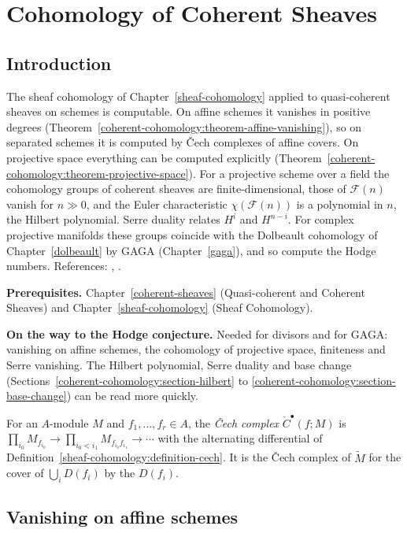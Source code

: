 \chapter{Cohomology of Coherent Sheaves}\label{coherent-cohomology}

\section{Introduction}\label{coherent-cohomology:section-introduction}

The sheaf cohomology of Chapter~\ref{sheaf-cohomology} applied to quasi-coherent sheaves on schemes is computable. On affine schemes it
vanishes in positive degrees (Theorem~\ref{coherent-cohomology:theorem-affine-vanishing}), so on separated schemes it is computed by \v{C}ech
complexes of affine covers. On projective space everything can be computed explicitly
(Theorem~\ref{coherent-cohomology:theorem-projective-space}). For a projective scheme over a field the cohomology groups of coherent sheaves are
finite-dimensional, those of $\mathcal{F}(n)$ vanish for $n \gg 0$, and the Euler characteristic $\chi(\mathcal{F}(n))$ is a polynomial in $n$, the
Hilbert polynomial. Serre duality relates $H^i$ and $H^{n-i}$. For complex projective manifolds these groups coincide with the Dolbeault
cohomology of Chapter~\ref{dolbeault} by GAGA (Chapter~\ref{gaga}), and so compute the Hodge numbers. References:
\cite[Chapter III]{hartshorne-ag}, \cite{stacks-project}.

\noindent\textbf{Prerequisites.} Chapter~\ref{coherent-sheaves} (Quasi-coherent and Coherent Sheaves) and Chapter~\ref{sheaf-cohomology}
(Sheaf Cohomology).

\noindent\textbf{On the way to the Hodge conjecture.} Needed for divisors and for GAGA: vanishing on affine schemes, the cohomology of projective space, finiteness and Serre vanishing. The Hilbert
polynomial, Serre duality and base change (Sections~\ref{coherent-cohomology:section-hilbert} to \ref{coherent-cohomology:section-base-change}) can be read more quickly.

For an $A$-module $M$ and $f_1, \ldots, f_r \in A$, the \emph{\v{C}ech complex} $\check C^\bullet(f; M)$ is
$\prod_{i_0}M_{f_{i_0}} \to \prod_{i_0 < i_1}M_{f_{i_0}f_{i_1}} \to \cdots$ with the alternating differential of
Definition~\ref{sheaf-cohomology:definition-cech}. It is the \v{C}ech complex of $\widetilde M$ for the cover of $\bigcup_iD(f_i)$ by the $D(f_i)$.

\section{Vanishing on affine schemes}\label{coherent-cohomology:section-affine}

